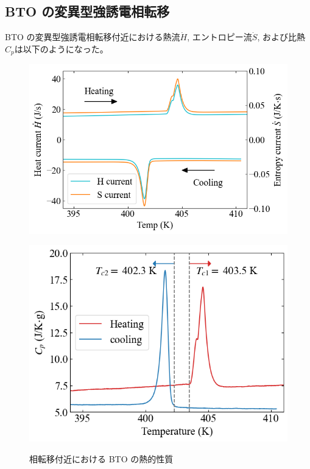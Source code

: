 \documentclass[9pt,dvipdfmx,a4paper]{jsarticle}
\begin{document}
\subsection{BTO の変異型強誘電相転移}
BTO の変異型強誘電相転移付近における熱流\(\dot{H}\), エントロピー流\(\dot{S}\), および比熱\(C_p\)は以下のようになった。
\begin{figure}[hbt]
    \centering
    \begin{minipage}[t]{0.52\columnwidth}
        \centering
        \includegraphics[width = \columnwidth]{result/BTO-current.png}
        \label{graph:BTO-current}
    \end{minipage}
    \hfill
    \begin{minipage}[t]{0.44\columnwidth}
        \centering
        \includegraphics[width = \columnwidth]{result/BTO-Cp.png}
        \label{graph:BTO-Cp}
    \end{minipage}
    \caption{相転移付近における BTO の熱的性質}
    \label{graph:BTO}
\end{figure}
\end{document}
